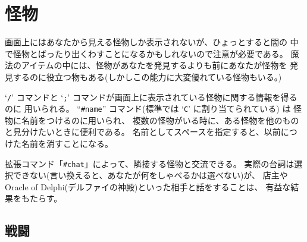 \section{怪物}

画面上にはあなたから見える怪物しか表示されないが、ひょっとすると闇の
中で怪物とばったり出くわすことになるかもしれないので注意が必要である。
魔法のアイテムの中には、怪物があなたを発見するよりも前にあなたが怪物を
発見するのに役立つ物もある(しかしこの能力に大変優れている怪物もいる。)

`{\tt /}' コマンドと `{\tt ;}' コマンドが画面上に表示されている怪物に関する情報を得るのに
用いられる。
``{\tt \#name}'' コマンド(標準では `{\tt C}' に割り当てられている) は
怪物に名前をつけるのに用いられ、
複数の怪物がいる時に、ある怪物を他のものと見分けたいときに便利である。
名前としてスペースを指定すると、以前につけた名前を消すことになる。

拡張コマンド「{\tt \#chat}」によって、隣接する怪物と交流できる。
実際の台詞は選択できない(言い換えると、あなたが何をしゃべるかは選べない)が、
店主や Oracle of Delphi(デルファイの神殿)といった相手と話をすることは、
有益な結果をもたらす。

\subsection*{戦闘}

